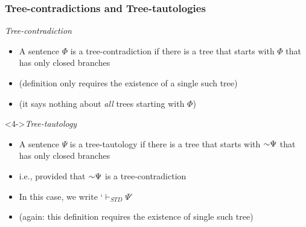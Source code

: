 \begin{frame}
\frametitle{Tree-contradictions and Tree-tautologies}

 \begin{block}{\emph{Tree-contradiction}}
    \begin{itemize}[<+->]
      \item A sentence $\Phi$ is a tree-contradiction if there is a tree that starts with $\Phi$ that has only closed branches

  \item (definition only requires the existence of a single such tree)

  \item (it says nothing about \textit{all} trees starting with $\Phi$)
\end{itemize} 
\end{block}

\begin{block}<4->{\emph{Tree-tautology}}
    \begin{itemize}[<+->]
      \item A sentence $\Psi$ is a tree-tautology if there is a tree that starts with $\enot \Psi$ that has only closed branches

\item i.e., provided that $\enot \Psi$ is a tree-contradiction

\item In this case, we write `$\vdash_{STD} \Psi$'

  \item (again: this definition requires the existence of single such tree)

\end{itemize} 
\end{block}




\end{frame}

